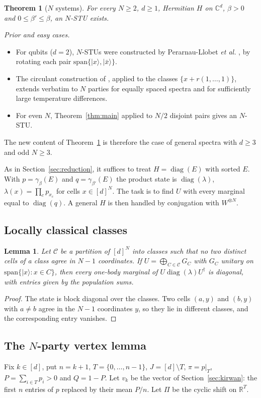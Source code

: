 \documentclass[11pt]{amsart}
\newtheorem{mainthm}{Theorem}
\newtheorem{lemma}{Lemma}[section]
\theoremstyle{definition}
\theoremstyle{remark}
\numberwithin{equation}{section}
\newcommand{\R}{\mathbb{R}}
\newcommand{\C}{\mathbb{C}}
\newcommand{\diag}{\operatorname{diag}}
\begin{document}
\begin{mainthm}[$N$ systems]\label{thm:nparty}
For every $N\ge2$, $d\ge1$, Hermitian $H$ on $\C^d$, $\beta>0$ and $0\le\beta'\le\beta$, an $N$-STU exists.
\end{mainthm}

\emph{Prior and easy cases.}
\begin{itemize}
\item For qubits ($d=2$), $N$-STUs were constructed by Perarnau-Llobet \emph{et al.} \cite{PerarnauLlobet2015}, by
rotating each pair $\mathrm{span}\{|x\rangle,|\bar x\rangle\}$.
\item The circulant construction of \cite{HuberEtAl2015}, applied to the classes $\{x+r(1,\dots,1)\}$, extends verbatim
to $N$ parties for equally spaced spectra and for sufficiently large temperature differences.
\item For even $N$, Theorem~\ref{thm:main} applied to $N/2$ disjoint pairs gives an $N$-STU.
\end{itemize}
The new content of Theorem~\ref{thm:nparty} is therefore the case of general spectra with $d\ge3$ and odd $N\ge3$.

As in Section~\ref{sec:reduction}, it suffices to treat $H=\diag(E)$ with sorted $E$. With $p=\gamma_\beta(E)$ and
$q=\gamma_{\beta'}(E)$ the product state is $\diag(\lambda)$, $\lambda(x)=\prod_cp_{x_c}$ for cells $x\in[d]^N$. The task
is to find $U$ with every marginal equal to $\diag(q)$. A general $H$ is then handled by conjugation with
$W^{\otimes N}$.

\subsection{Locally classical classes}
\begin{lemma}\label{lem:lcsN}
Let $\mathcal C$ be a partition of $[d]^N$ into classes such that no two distinct cells of a class agree in $N-1$
coordinates. If $U=\bigoplus_{C\in\mathcal C}G_C$ with $G_C$ unitary on $\mathrm{span}\{|x\rangle:x\in C\}$, then every
one-body marginal of $U\diag(\lambda)U^\dagger$ is diagonal, with entries given by the population sums.
\end{lemma}
\begin{proof}
The state is block diagonal over the classes. Two cells $(a,y)$ and $(b,y)$ with $a\ne b$ agree in the $N-1$
coordinates $y$, so they lie in different classes, and the corresponding entry vanishes.
\end{proof}

\subsection{The $N$-party vertex lemma}
Fix $k\in[d]$, put $n=k+1$, $T=\{0,\dots,n-1\}$, $J=[d]\setminus T$, $\pi=p|_T$, $P=\sum_{i\in T}p_i>0$ and $Q=1-P$. Let
$v_k$ be the vector of Section~\ref{sec:kirwan}: the first $n$ entries of $p$ replaced by their mean $P/n$. Let
$\Pi$ be the cyclic shift on $\R^T$.
\end{document}
